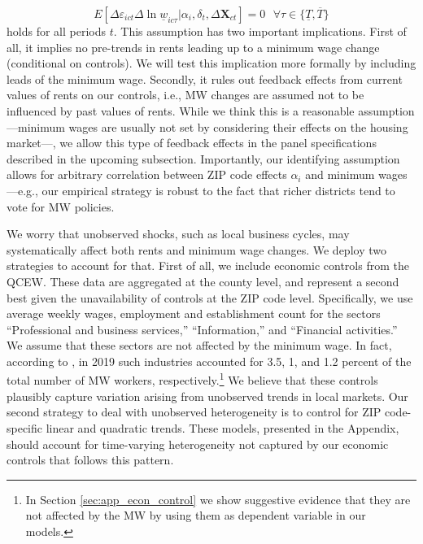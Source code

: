 \begin{equation*}
	E[\Delta \varepsilon_{ict} \Delta \ln \underline{w}_{ic\tau}  
							| \alpha_i, \delta_t, \Delta \mathbf{X}_{ct}] = 0
	\ \ \ \forall \tau \in \{\underline{T}, \overline{T} \}
\end{equation*}
holds for all periods $t$. This assumption has two important implications. First of all, 
it implies no pre-trends in rents leading up to a minimum wage change (conditional on 
controls). We will test this implication more formally by including leads of the minimum 
wage. Secondly, it rules out feedback effects from current values of rents on our controls, 
i.e., MW changes are assumed not to be influenced by past values of rents. While we think 
this is a reasonable assumption---minimum wages are usually not set by considering their 
effects on the housing market---, we allow this type of feedback effects in the panel 
specifications described in the upcoming subsection. Importantly, our identifying assumption 
allows for arbitrary correlation between ZIP code effects $\alpha_i$ and minimum wages 
---e.g., our empirical strategy is robust to the fact that richer districts tend to vote 
for MW policies.


We worry that unobserved shocks, such as local business cycles, may systematically affect 
both rents and minimum wage changes. We deploy two strategies to account for that. First 
of all, we include economic controls from the QCEW. 
These data are aggregated at the county level, and represent a second best given the 
unavailability of controls at the ZIP code level. Specifically, we use average weekly wages, 
employment and establishment count for the sectors ``Professional and business services,'' 
``Information,'' and ``Financial activities.'' We assume that these sectors are not affected 
by the minimum wage. In fact, according to \textcite[][table 5]{MinWorkersReportBLS}, in 2019 
such industries accounted for 3.5, 1, and 1.2 percent of the total number of MW workers, 
respectively.\footnote{In Section \ref{sec:app_econ_control} we show suggestive evidence 
	that they are not affected by the MW by using them as dependent variable in our models.}
We believe that these controls plausibly capture variation arising from unobserved trends 
in local markets. Our second strategy to deal with unobserved heterogeneity is to control for
ZIP code-specific linear and quadratic trends. These models, presented in the Appendix, 
should account for time-varying heterogeneity not captured by our economic controls that 
follows this pattern.

